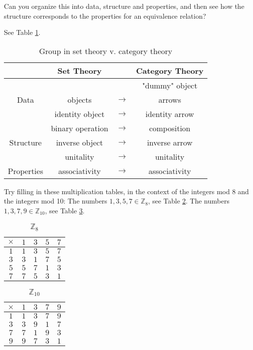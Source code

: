 \begin{ttta}
Can you organize this into data, structure and properties, and then see
how the structure corresponds to the properties for an equivalence relation?
\end{ttta}
See Table \ref{tbl:group}.
\begin{table}
    \centering
    \begin{tabular}{ c|ccc }
    \hline
    & Set Theory & & Category Theory \\ \hline
    & & & "dummy" object \\
    Data & objects & $\rightarrow$ & arrows \\ \hline
    & identity object & $\rightarrow$ & identity arrow \\
    & binary operation & $\rightarrow$ & composition \\
    Structure & inverse object & $\rightarrow$ & inverse arrow \\ \hline
    & unitality & $\rightarrow$ & unitality \\
    Properties & associativity& $\rightarrow$ & associativity
    \\\hline
    \end{tabular}
    \caption{Group in set theory v. category theory}
    \label{tbl:group}
\end{table}
\begin{ttta}
Try filling in these multiplication tables, in the context of the integers
mod 8 and the integers mod 10:
The numbers $1, 3, 5, 7\in \mathbb{Z}_8$, see Table \ref{tbl:z8}.
The numbers $1, 3, 7, 9\in \mathbb{Z}_{10}$, see Table \ref{tbl:z10}.
\end{ttta}
\begin{table}
\centering
\begin{tabular}{c|cccc}
 $\times $ & $1$ & $3$ & $5$ & $7$ \\
 \hline
 $1$ & $1$ & $3$ & $5$ & $7$ \\
 $3$ & $3$ & $1$ & $7$ & $5$ \\
 $5$ & $5$ & $7$ & $1$ & $3$ \\
 $7$ & $7$ & $5$ & $3$ & $1$ \\
\end{tabular}
\caption{$\mathbb{Z}_8$}
\label{tbl:z8}
\end{table}
\begin{table}
\centering
\begin{tabular}{c|cccc}
 $\times $ & $1$ & $3$ & $7$ & $9$ \\
 \hline
 $1$ & $1$ & $3$ & $7$ & $9$ \\
 $3$ & $3$ & $9$ & $1$ & $7$ \\
 $7$ & $7$ & $1$ & $9$ & $3$ \\
 $9$ & $9$ & $7$ & $3$ & $1$ \\
\end{tabular}
\caption{$\mathbb{Z}_{10}$}
\label{tbl:z10}
\end{table}

